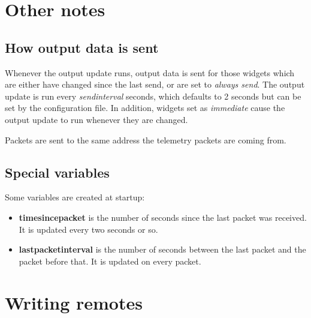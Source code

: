 \section{Other notes}

\subsection{How output data is sent}
\label{subhowout}
Whenever the output update runs, output data is sent for those widgets which
are either have changed since the last send, or are set to \emph{always send}.
The output update is run every \emph{sendinterval} seconds, which defaults to
2 seconds but can be set by the configuration file. In addition, widgets set
as \emph{immediate} cause the output update to run whenever they are changed.

Packets are sent to the same address the telemetry packets are coming from.


\subsection{Special variables}
Some variables are created at startup:
\begin{itemize}
\item \textbf{timesincepacket} is the number of seconds since the last packet
was received. It is updated every two seconds or so.
\item \textbf{lastpacketinterval} is the number of seconds between the last
packet and the packet before that. It is updated on every packet.
\end{itemize}

\section{Writing remotes}
